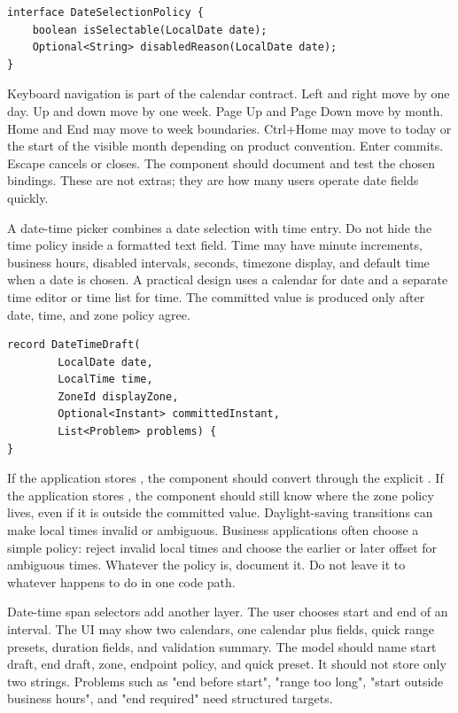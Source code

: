 \begin{lstlisting}[caption={Selectable-date policy stays outside painting.}]
interface DateSelectionPolicy {
    boolean isSelectable(LocalDate date);
    Optional<String> disabledReason(LocalDate date);
}
\end{lstlisting}

Keyboard navigation is part of the calendar contract. Left and right move by one day. Up
and down move by one week. Page Up and Page Down move by month. Home and End may move to
week boundaries. Ctrl+Home may move to today or the start of the visible month depending
on product convention. Enter commits. Escape cancels or closes. The component should
document and test the chosen bindings. These are not extras; they are how many users
operate date fields quickly.

A date-time picker combines a date selection with time entry. Do not hide the time
policy inside a formatted text field. Time may have minute increments, business hours,
disabled intervals, seconds, timezone display, and default time when a date is chosen. A
practical design uses a calendar for date and a separate time editor or time list for
time. The committed value is produced only after date, time, and zone policy agree.

\begin{lstlisting}[caption={Date-time draft state names the zone policy.}]
record DateTimeDraft(
        LocalDate date,
        LocalTime time,
        ZoneId displayZone,
        Optional<Instant> committedInstant,
        List<Problem> problems) {
}
\end{lstlisting}

If the application stores
, the component should
convert through the explicit . If the application stores
, the
component should still know where the zone policy lives, even if it is outside the
committed value. Daylight-saving transitions can make local times invalid or ambiguous.
Business applications often choose a simple policy: reject invalid local times and
choose the earlier or later offset for ambiguous times. Whatever the policy is, document
it. Do not leave it to whatever
 happens to do in one code path.

Date-time span selectors add another layer. The user chooses start and end of an
interval. The UI may show two calendars, one calendar plus fields, quick range presets,
duration fields, and validation summary. The model should name start draft, end draft,
zone, endpoint policy, and quick preset. It should not store only two strings. Problems
such as "end before start", "range too long", "start outside business hours", and "end
required" need structured targets.


